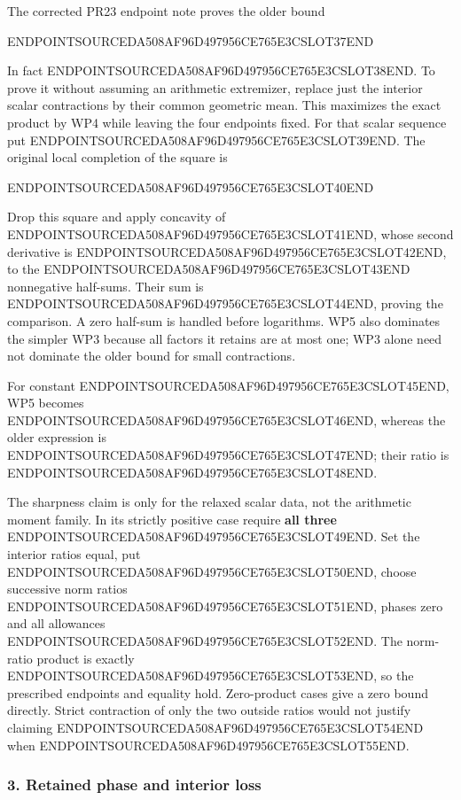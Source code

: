 The corrected PR23 endpoint note proves the older bound

ENDPOINTSOURCEDA508AF96D497956CE765E3CSLOT37END

In fact ENDPOINTSOURCEDA508AF96D497956CE765E3CSLOT38END. To prove it without assuming an arithmetic extremizer, replace just the interior scalar contractions by their common geometric mean. This maximizes the exact product by WP4 while leaving the four endpoints fixed. For that scalar sequence put ENDPOINTSOURCEDA508AF96D497956CE765E3CSLOT39END. The original local completion of the square is

ENDPOINTSOURCEDA508AF96D497956CE765E3CSLOT40END

Drop this square and apply concavity of ENDPOINTSOURCEDA508AF96D497956CE765E3CSLOT41END, whose second derivative is ENDPOINTSOURCEDA508AF96D497956CE765E3CSLOT42END, to the ENDPOINTSOURCEDA508AF96D497956CE765E3CSLOT43END nonnegative half-sums. Their sum is ENDPOINTSOURCEDA508AF96D497956CE765E3CSLOT44END, proving the comparison. A zero half-sum is handled before logarithms. WP5 also dominates the simpler WP3 because all factors it retains are at most one; WP3 alone need not dominate the older bound for small contractions.

For constant ENDPOINTSOURCEDA508AF96D497956CE765E3CSLOT45END, WP5 becomes ENDPOINTSOURCEDA508AF96D497956CE765E3CSLOT46END, whereas the older expression is ENDPOINTSOURCEDA508AF96D497956CE765E3CSLOT47END; their ratio is ENDPOINTSOURCEDA508AF96D497956CE765E3CSLOT48END.

The sharpness claim is only for the relaxed scalar data, not the arithmetic moment family. In its strictly positive case require \textbf{all three} ENDPOINTSOURCEDA508AF96D497956CE765E3CSLOT49END. Set the interior ratios equal, put ENDPOINTSOURCEDA508AF96D497956CE765E3CSLOT50END, choose successive norm ratios ENDPOINTSOURCEDA508AF96D497956CE765E3CSLOT51END, phases zero and all allowances ENDPOINTSOURCEDA508AF96D497956CE765E3CSLOT52END. The norm-ratio product is exactly ENDPOINTSOURCEDA508AF96D497956CE765E3CSLOT53END, so the prescribed endpoints and equality hold. Zero-product cases give a zero bound directly. Strict contraction of only the two outside ratios would not justify claiming ENDPOINTSOURCEDA508AF96D497956CE765E3CSLOT54END when ENDPOINTSOURCEDA508AF96D497956CE765E3CSLOT55END.

\subsubsection{3. Retained phase and interior loss}\label{endpoint-window_product_owner--retained-phase-and-interior-loss}

